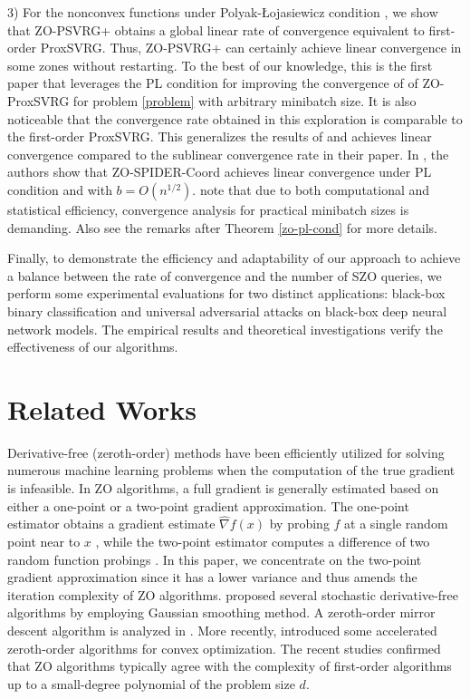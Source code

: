 \documentclass{article}
\theoremstyle{definition}
\theoremstyle{remark}
\begin{document}
3) For the nonconvex functions under Polyak-Łojasiewicz condition \cite{polyak1963gradient}, we show that ZO-PSVRG+
obtains a global linear rate of convergence  equivalent to first-order ProxSVRG. Thus, ZO-PSVRG+ can certainly achieve linear convergence in some zones without restarting. To the best of
our knowledge, this is the first paper that leverages the PL condition for improving the convergence of of ZO-ProxSVRG for problem \eqref{problem} with arbitrary minibatch size. It is also noticeable that the convergence rate obtained in this exploration is comparable to the first-order ProxSVRG. This generalizes the results of \cite{duchi2015optimal} and  achieves linear convergence compared to the sublinear convergence rate in their paper.
In \cite{ji2019improved}, the authors show that  ZO-SPIDER-Coord achieves linear convergence under PL condition and with $b = O(n^{1/2})$.  
note that due to both computational and statistical efficiency, convergence analysis for practical minibatch sizes is demanding. Also see the remarks after Theorem \ref{zo-pl-cond} for more details. 

Finally, to demonstrate the efficiency and adaptability of our approach to achieve a balance between the rate of convergence and the number of SZO queries, we perform some
experimental evaluations for two distinct applications: black-box binary classification and universal adversarial
attacks on black-box deep neural network models. The empirical results and
theoretical investigations verify the effectiveness of our algorithms.


\section{Related Works}
Derivative-free (zeroth-order) methods have been efficiently utilized for solving numerous machine learning problems when the computation of the true gradient is infeasible. In ZO algorithms, a full gradient is generally estimated based on either a one-point or a two-point gradient approximation. The one-point estimator obtains a gradient estimate $\hat{\nabla} f(x)$ by probing $f$ at a single random point near to $x$ \cite{flaxman2005online,shamir2013complexity},  while the two-point estimator computes a difference of two random function probings \cite{agarwal2010optimal,nesterov2017random}. In this paper, we concentrate on the two-point gradient approximation since it has a lower variance and thus amends the iteration complexity of ZO algorithms. \cite{nesterov2017random} proposed several stochastic derivative-free
algorithms by employing Gaussian smoothing method.  A zeroth-order mirror descent algorithm is analyzed in \cite{duchi2015optimal}. 
More recently, \cite{yu2018generic,dvurechensky2018accelerated} introduced some accelerated zeroth-order algorithms for convex optimization. The recent studies confirmed that ZO algorithms typically agree with the complexity of first-order algorithms up to a small-degree polynomial of the problem size $d$.
\end{document}
